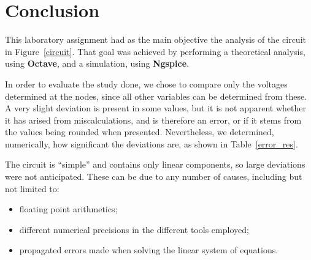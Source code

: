 \section{Conclusion}
\label{sec:conclusion}

This laboratory assignment had as the main objective the analysis of the circuit in Figure~\ref{circuit}. That goal was achieved by performing a theoretical analysis, using {\bf Octave}, and a simulation, using {\bf Ngspice}.

In order to evaluate the study done, we chose to compare only the voltages determined at the nodes, since all other variables can be determined from these. A very slight deviation is present in some values, but it is not apparent whether it has arised from miscalculations, and is therefore an error, or if it stems from the values being rounded when presented. Nevertheless, we determined, numerically, how significant the deviations are, as shown in Table~\ref{error_res}.



The circuit is ``simple'' and contains only linear components, so large deviations were not anticipated. These can be due to any number of causes, including but not limited to:

\begin{itemize}
\item floating point arithmetics;
\item different numerical precisions in the different tools employed;
\item propagated errors made when solving the linear system of equations.
\end{itemize}




